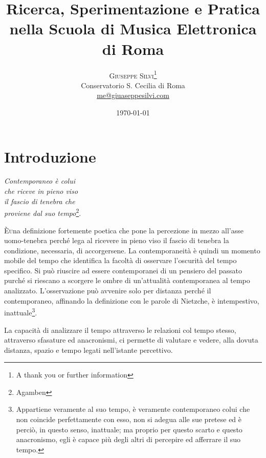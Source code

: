 \documentclass[
	a4paper,
	twocolumn
	]{article}
\title{Ricerca, Sperimentazione e Pratica nella Scuola di Musica Elettronica di Roma} %
\author{%
\textsc{Giuseppe Silvi}\thanks{A thank you or further information} \\[1ex] %
\normalsize Conservatorio S. Cecilia di Roma \\ %
\normalsize \href{mailto:me@giuseppesilvi.com}{me@giuaseppesilvi.com} %
}
\date{\today} %
\begin{document}
\maketitle




\section{Introduzione}

\begin{flushright}
\textit{
Contemporaneo è colui \\
che riceve in pieno viso \\
il fascio di tenebra che \\
proviene dal suo tempo}\footnote{Agamben}.
\end{flushright}


\lettrine[nindent=0em,lines=3]{È} una definizione fortemente poetica che pone la percezione in mezzo all'asse uomo-tenebra perché lega al ricevere in pieno viso il fascio di tenebra la condizione, necessaria, di accorgersene. La contemporaneità è quindi un momento mobile del tempo che identifica la facoltà di osservare l'oscurità del tempo specifico. Si può riuscire ad essere contemporanei di un pensiero del passato purché si riescano a scorgere le ombre di un'attualità contemporanea al tempo analizzato. L'osservazione può avvenire solo per distanza perché il contemporaneo, affinando la definizione con le parole di Nietzche, è intempestivo, inattuale\footnote{Appartiene veramente al suo tempo, è veramente contemporaneo colui che non coincide perfettamente con esso, non si adegua alle sue pretese ed è perciò, in questo senso, inattuale; ma proprio per questo scarto e questo anacronismo, egli è capace pi\`u degli altri di percepire ed afferrare il suo tempo.}.

La capacità di analizzare il tempo attraverso le relazioni col tempo stesso, attraverso sfasature ed anacronismi, ci permette di valutare e vedere, alla dovuta distanza, spazio e tempo legati nell'istante percettivo.
\end{document}
